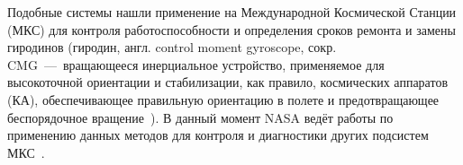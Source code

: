 Подобные системы нашли применение на Международной Космической Станции (МКС) для контроля работоспособности и определения сроков ремонта и замены гиродинов (гиродин, англ. control moment gyroscope, сокр. CMG~---~вращающееся инерциальное устройство, применяемое для высокоточной ориентации и стабилизации, как правило, космических аппаратов (КА), обеспечивающее правильную ориентацию в полете и предотвращающее беспорядочное вращение~\cite{WikiGirodyn}). В данный момент NASA ведёт работы по применению данных методов для контроля и диагностики других подсистем МКС~\cite{IversonSHMforSpaceMissionOperations}.